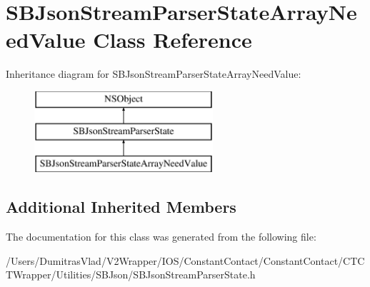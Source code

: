 \hypertarget{interface_s_b_json_stream_parser_state_array_need_value}{\section{S\-B\-Json\-Stream\-Parser\-State\-Array\-Need\-Value Class Reference}
\label{interface_s_b_json_stream_parser_state_array_need_value}
}
Inheritance diagram for S\-B\-Json\-Stream\-Parser\-State\-Array\-Need\-Value\-:\begin{figure}[H]
\begin{center}
\leavevmode
\includegraphics[height=3.000000cm]{interface_s_b_json_stream_parser_state_array_need_value}
\end{center}
\end{figure}
\subsection*{Additional Inherited Members}


The documentation for this class was generated from the following file\-:\begin{DoxyCompactItemize}
\item 
/\-Users/\-Dumitras\-Vlad/\-V2\-Wrapper/\-I\-O\-S/\-Constant\-Contact/\-Constant\-Contact/\-C\-T\-C\-T\-Wrapper/\-Utilities/\-S\-B\-Json/S\-B\-Json\-Stream\-Parser\-State.\-h\end{DoxyCompactItemize}
